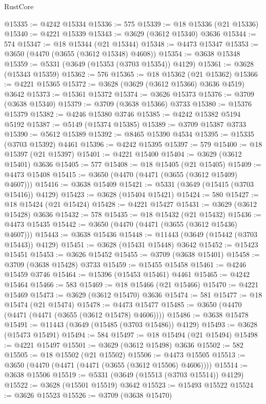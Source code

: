 \begin{lexlean}{RustCore}
\begin{coremodule}
@15335 := @4242 @15334
@15336 := 575
@15339 := @18 @15336 (@21 @15336)
@15340 := @4221 @15339
@15343 := @3629 (@3612 @15340) @3636
@15344 := 574
@15347 := @18 @15344 (@21 @15344)
@15348 := @4473 @15347
@15353 := @3650 (@4470 (@3655 (@3612 @15348) @4608))
@15354 := @3638 @15348
@15359 := @5331 (@3649 (@15353 (@3703 @15354)) @4129)
@15361 := @3628 (@15343 @15359)
@15362 := 576
@15365 := @18 @15362 (@21 @15362)
@15366 := @4221 @15365
@15372 := @3628 (@3629 (@3612 @15366) @3636 @4519) @3642
@15373 := @15361 @15372
@15374 := @3626 @15373
@15376 := @3709 (@3638 @15340)
@15379 := @3709 (@3638 @15366) @3733
@15380 := @15376 @15379
@15382 := @4246 @15380 @3746
@15385 := @4242 @15382 @5194 @5192
@15387 := @5149 (@15374 @15385)
@15389 := @3709 @15387 @3733
@15390 := @5612 @15389
@15392 := @8465 @15390 @4534
@15395 := @15335 (@3703 @15392) @4461
@15396 := @4242 @15395
@15397 := 579
@15400 := @18 @15397 (@21 @15397)
@15401 := @4221 @15400
@15404 := @3629 (@3612 @15401) @3636
@15405 := 577
@15408 := @18 @15405 (@21 @15405)
@15409 := @4473 @15408
@15415 := @3650 (@4470 (@4471 (@3655 (@3612 @15409) @4607)))
@15416 := @3638 @15409
@15421 := @5331 (@3649 (@15415 (@3703 @15416)) @4129)
@15423 := @3628 (@15404 @15421)
@15424 := 580
@15427 := @18 @15424 (@21 @15424)
@15428 := @4221 @15427
@15431 := @3629 (@3612 @15428) @3636
@15432 := 578
@15435 := @18 @15432 (@21 @15432)
@15436 := @4473 @15435
@15442 := @3650 (@4470 (@4471 (@3655 (@3612 @15436) @4607)))
@15443 := @3638 @15436
@15448 := @11443 (@3649 (@15442 (@3703 @15443)) @4129)
@15451 := @3628 (@15431 @15448) @3642
@15452 := @15423 @15451
@15453 := @3626 @15452
@15455 := @3709 (@3638 @15401)
@15458 := @3709 (@3638 @15428) @3733
@15459 := @15455 @15458
@15461 := @4246 @15459 @3746
@15464 := @15396 (@15453 @15461) @4461
@15465 := @4242 @15464
@15466 := 583
@15469 := @18 @15466 (@21 @15466)
@15470 := @4221 @15469
@15473 := @3629 (@3612 @15470) @3636
@15474 := 581
@15477 := @18 @15474 (@21 @15474)
@15478 := @4473 @15477
@15485 := @3650 (@4470 (@4471 (@4471 (@3655 (@3612 @15478) @4606))))
@15486 := @3638 @15478
@15491 := @11443 (@3649 (@15485 (@3703 @15486)) @4129)
@15493 := @3628 (@15473 @15491)
@15494 := 584
@15497 := @18 @15494 (@21 @15494)
@15498 := @4221 @15497
@15501 := @3629 (@3612 @15498) @3636
@15502 := 582
@15505 := @18 @15502 (@21 @15502)
@15506 := @4473 @15505
@15513 := @3650 (@4470 (@4471 (@4471 (@3655 (@3612 @15506) @4606))))
@15514 := @3638 @15506
@15519 := @5331 (@3649 (@15513 (@3703 @15514)) @4129)
@15522 := @3628 (@15501 @15519) @3642
@15523 := @15493 @15522
@15524 := @3626 @15523
@15526 := @3709 (@3638 @15470)

\end{coremodule}
\end{lexlean}
